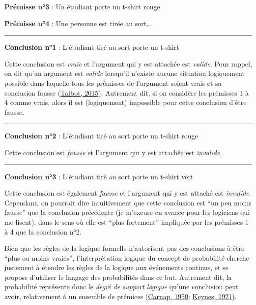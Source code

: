 \documentclass[
  a4paper,11pt,twoside,onecolumn,openright,final,oldfontcommands]{memoir}
\theoremstyle{definition}
\theoremstyle{definition}
\theoremstyle{definition}
\theoremstyle{definition}
\theoremstyle{remark}
\begin{document}
\textbf{Prémisse n°3} : Un étudiant porte un t-shirt rouge

\textbf{Prémisse n°4} : Une personne est tirée au sort\ldots{}

\par

\noindent

\rule{\textwidth}{1pt}

\textbf{Conclusion n°1} : L'étudiant tiré au sort porte un t-shirt

Cette conclusion est \emph{vraie} et l'argument qui y est attachée est \emph{valide}. Pour rappel, on dit qu'un argument est \emph{valide} lorsqu'il n'existe aucune situation logiquement possible dans laquelle tous les prémisses de l'argument soient vrais et sa conclusion fausse (\protect\hyperlink{ref-talbot_critical_2015}{Talbot, 2015}). Autrement dit, si on considère les prémisses 1 à 4 comme vrais, alors il est (logiquement) impossible pour cette conclusion d'être fausse.

\par

\noindent

\rule{\textwidth}{1pt}

\textbf{Conclusion n°2} : L'étudiant tiré au sort porte un t-shirt rouge

Cette conclusion est \emph{fausse} et l'argument qui y est attachée est \emph{invalide.}

\par

\noindent

\rule{\textwidth}{1pt}

\textbf{Conclusion n°3} : L'étudiant tiré au sort porte un t-shirt vert

Cette conclusion est également \emph{fausse} et l'argument qui y est attaché est \emph{invalide}. Cependant, on pourrait dire intuitivement que cette conclusion est ``un peu moins fausse'' que la conclusion précédente (je m'excuse en avance pour les logiciens qui me lisent), dans le sens où elle est ``plus fortement'' impliquée par les prémisses 1 à 4 que la conclusion n°2.

Bien que les règles de la logique formelle n'autorisent pas des conclusions à être ``plus ou moins vraies'', l'interprétation logique du concept de probabilité cherche justement à étendre les règles de la logique aux événements continus, et se propose d'utiliser le langage des probabilités dans ce but. Autrement dit, la probabilité représente donc le \emph{degré de support logique} qu'une conclusion peut avoir, relativement à un ensemble de prémices (\protect\hyperlink{ref-carnap_logical_1950}{Carnap, 1950}; \protect\hyperlink{ref-keynes_treatise_1921}{Keynes, 1921}).
\end{document}
